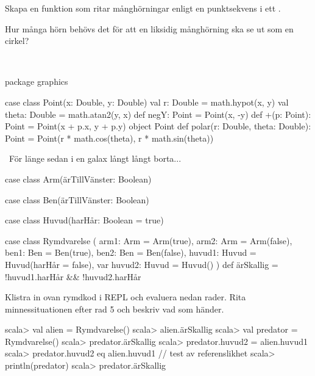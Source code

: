 \Subtask Skapa en funktion  som ritar månghörningar enligt en punktsekvens  i ett .

\Subtask Hur många hörn behövs det för att en liksidig månghörning ska se ut som en cirkel?

\SOLUTION

\TaskSolved \what~

\Subtask \begin{Code}
package graphics

case class Point(x: Double, y: Double) {
  val r: Double          = math.hypot(x, y)
  val theta: Double      = math.atan2(y, x)
  def negY: Point        = Point(x, -y)
  def +(p: Point): Point = Point(x + p.x, y + p.y)
}
object Point {
  def polar(r: Double, theta: Double): Point =
    Point(r * math.cos(theta), r * math.sin(theta))
}
\end{Code}

\Subtask \TODO

\Subtask \TODO

\Subtask \TODO


\QUESTEND





\QUESTBEGIN

\Task  \what~För länge sedan i en galax långt långt borta...

\begin{Code}
case class Arm(ärTillVänster: Boolean)

case class Ben(ärTillVänster: Boolean)

case class Huvud(harHår: Boolean = true)

case class Rymdvarelse (
      arm1:   Arm   = Arm(true),
      arm2:   Arm   = Arm(false),
      ben1:   Ben   = Ben(true),
      ben2:   Ben   = Ben(false),
      huvud1: Huvud = Huvud(harHår = false),
  var huvud2: Huvud = Huvud()
) {
  def ärSkallig = !huvud1.harHår && !huvud2.harHår
}
\end{Code}

\Subtask Klistra in ovan rymdkod i REPL och evaluera nedan rader. Rita minnessituationen efter rad 5 och beskriv vad som händer.
\begin{REPL}
scala> val alien = Rymdvarelse()
scala> alien.ärSkallig
scala> val predator = Rymdvarelse()
scala> predator.ärSkallig
scala> predator.huvud2 = alien.huvud1
scala> predator.huvud2 eq alien.huvud1  // test av referenslikhet
scala> println(predator)
scala> predator.ärSkallig
\end{REPL}

